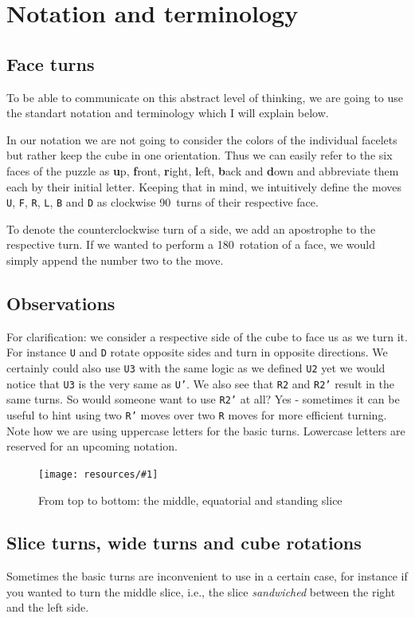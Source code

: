 \documentclass[a4paper]{scrreprt}
\newcommand{\img}[3]{
	\begin{figure}[ht]
	\centering
  \texttt{[image: resources/\#1]}
	\caption*{#3}
	\end{figure}
}
\begin{document}
\section{Notation and terminology}
\subsection{Face turns}
To be able to communicate on this abstract level of thinking, we are going to use the standart notation and terminology which I will explain below.\par
In our notation we are not going to consider the colors of the individual facelets but rather keep the cube in one orientation. Thus we can easily refer to the six faces of the puzzle as \textbf{u}p, \textbf{f}ront, \textbf{r}ight, \textbf{l}eft, \textbf{b}ack and \textbf{d}own and abbreviate them each by their initial letter. Keeping that in mind, we intuitively define the moves \texttt{U}, \texttt{F}, \texttt{R}, \texttt{L}, \texttt{B} and \texttt{D} as clockwise 90\textdegree\ turns of their respective face.\par
To denote the counterclockwise turn of a side, we add an apostrophe to the respective turn. If we wanted to perform a 180\textdegree\ rotation of a face, we would simply append the number two to the move.


\subsection{Observations}
For clarification: we consider a respective side of the cube to face us as we turn it. For instance \texttt{U} and \texttt{D} rotate opposite sides and turn in opposite directions. We certainly could also use \texttt{U3} with the same logic as we defined \texttt{U2} yet we would notice that \texttt{U3} is the very same as \texttt{U'}. We also see that \texttt{R2} and \texttt{R2'} result in the same turns. So would someone want to use \texttt{R2'} at all? Yes - sometimes it can be useful to hint using two \texttt{R'} moves over two \texttt{R} moves for more efficient turning. Note how we are using uppercase letters for the basic turns. Lowercase letters are reserved for an upcoming notation.

\img{slices.png}{0.4}{From top to bottom: the middle, equatorial and standing slice}

\subsection{Slice turns, wide turns and cube rotations}
Sometimes the basic turns are inconvenient to use in a certain case, for instance if you wanted to turn the middle slice, i.e., the slice \emph{sandwiched} between the right and the left side.\par
\end{document}
